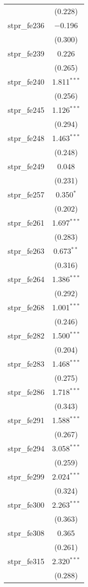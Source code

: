 \begin{table}[!htbp]
\begin{tabular}{@{\extracolsep{5pt}}lc}
  & (0.228) \\ 
  stpr\_fe236 & $-$0.196 \\ 
  & (0.300) \\ 
  stpr\_fe239 & 0.226 \\ 
  & (0.265) \\ 
  stpr\_fe240 & 1.811$^{***}$ \\ 
  & (0.256) \\ 
  stpr\_fe245 & 1.126$^{***}$ \\ 
  & (0.294) \\ 
  stpr\_fe248 & 1.463$^{***}$ \\ 
  & (0.248) \\ 
  stpr\_fe249 & 0.048 \\ 
  & (0.231) \\ 
  stpr\_fe257 & 0.350$^{*}$ \\ 
  & (0.202) \\ 
  stpr\_fe261 & 1.697$^{***}$ \\ 
  & (0.283) \\ 
  stpr\_fe263 & 0.673$^{**}$ \\ 
  & (0.316) \\ 
  stpr\_fe264 & 1.386$^{***}$ \\ 
  & (0.292) \\ 
  stpr\_fe268 & 1.001$^{***}$ \\ 
  & (0.246) \\ 
  stpr\_fe282 & 1.500$^{***}$ \\ 
  & (0.204) \\ 
  stpr\_fe283 & 1.468$^{***}$ \\ 
  & (0.275) \\ 
  stpr\_fe286 & 1.718$^{***}$ \\ 
  & (0.343) \\ 
  stpr\_fe291 & 1.588$^{***}$ \\ 
  & (0.267) \\ 
  stpr\_fe294 & 3.058$^{***}$ \\ 
  & (0.259) \\ 
  stpr\_fe299 & 2.024$^{***}$ \\ 
  & (0.324) \\ 
  stpr\_fe300 & 2.263$^{***}$ \\ 
  & (0.363) \\ 
  stpr\_fe308 & 0.365 \\ 
  & (0.261) \\ 
  stpr\_fe315 & 2.320$^{***}$ \\ 
  & (0.288) \\ 

\end{tabular}
\end{table}
